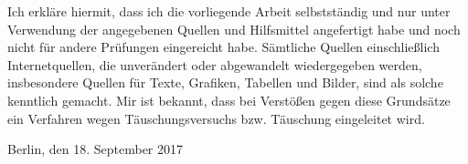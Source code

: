 \documentclass[11pt,]{article}
\begin{document}
\vspace*{1.5\baselineskip}

\large Ich erkläre hiermit, dass ich die vorliegende Arbeit
selbstständig und nur unter Verwendung der angegebenen Quellen und
Hilfsmittel angefertigt habe und noch nicht für andere Prüfungen
eingereicht habe. Sämtliche Quellen einschließlich Internetquellen, die
unverändert oder abgewandelt wiedergegeben werden, insbesondere Quellen
für Texte, Grafiken, Tabellen und Bilder, sind als solche kenntlich
gemacht. Mir ist bekannt, dass bei Verstößen gegen diese Grundsätze ein
Verfahren wegen Täuschungsversuchs bzw. Täuschung eingeleitet wird.

\vspace*{3\baselineskip}

Berlin, den 18. September 2017
\end{document}
